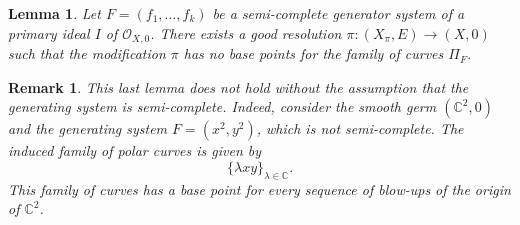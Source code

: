 \documentclass[reqno,dvipsnames,12pt]{amsart}
\newtheorem{lemm}[thm]{Lemma}
\newtheorem{rema}[thm]{Remark}
\begin{document}
\begin{lemm}\label{basepointpolar}
Let $F=(f_1,\dots,f_k)$ be a semi-complete generator system of a primary ideal $I$ of $\mathcal{O}_{X,0}$. There exists a good resolution
$\pi:(X_{\pi},E) \longrightarrow (X,0)$
such that the modification $\pi$ has no base points for the family of curves $\Pi_F$.
\end{lemm}
\begin{rema}
    This last lemma does not hold without the assumption that the generating system is semi-complete. Indeed, consider the smooth germ $(\mathbb{C}^2,0)$ and the generating system $F=(x^2,y^2)$, which is not semi-complete. The induced family of polar curves is given by
    \[
        \{\lambda xy\}_{\lambda \in \mathbb{C}} .
    \]
    This family of curves has a base point for every sequence of blow-ups of the origin of $\mathbb{C}^2$.
\end{rema}
\end{document}
